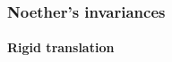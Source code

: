 \documentclass[a4paper]{article}
\begin{document}
\subsubsection{Noether's invariances}
\cite{Avery2015}

\paragraph{Rigid translation}

%


\printbibliography
\end{document}
